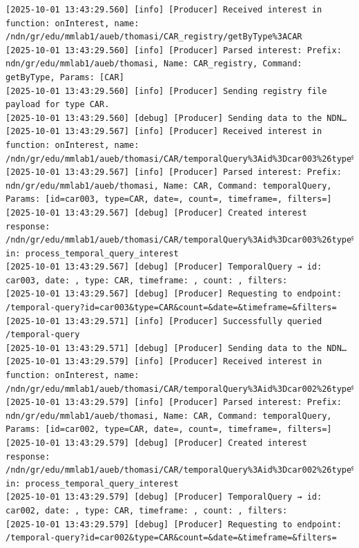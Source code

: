 \documentclass{article}
\begin{document}
\begin{lstlisting}[language=log, caption={Producer logs after receiving a \emph{GET by TYPE} request from \emph{MMLab2}}, label={lst:producer-logs-get-by-type-from-mmlab2}]
[2025-10-01 13:43:29.560] [info] [Producer] Received interest in function: onInterest, name: /ndn/gr/edu/mmlab1/aueb/thomasi/CAR_registry/getByType%3ACAR
[2025-10-01 13:43:29.560] [info] [Producer] Parsed interest: Prefix: ndn/gr/edu/mmlab1/aueb/thomasi, Name: CAR_registry, Command: getByType, Params: [CAR]
[2025-10-01 13:43:29.560] [info] [Producer] Sending registry file payload for type CAR.
[2025-10-01 13:43:29.560] [debug] [Producer] Sending data to the NDN…
[2025-10-01 13:43:29.567] [info] [Producer] Received interest in function: onInterest, name: /ndn/gr/edu/mmlab1/aueb/thomasi/CAR/temporalQuery%3Aid%3Dcar003%26type%3DCAR%26date%3D%26count%3D%26timeframe%3D%26filters%3D
[2025-10-01 13:43:29.567] [info] [Producer] Parsed interest: Prefix: ndn/gr/edu/mmlab1/aueb/thomasi, Name: CAR, Command: temporalQuery, Params: [id=car003, type=CAR, date=, count=, timeframe=, filters=]
[2025-10-01 13:43:29.567] [debug] [Producer] Created interest response: /ndn/gr/edu/mmlab1/aueb/thomasi/CAR/temporalQuery%3Aid%3Dcar003%26type%3DCAR%26date%3D%26count%3D%26timeframe%3D%26filters%3D in: process_temporal_query_interest
[2025-10-01 13:43:29.567] [debug] [Producer] TemporalQuery → id: car003, date: , type: CAR, timeframe: , count: , filters: 
[2025-10-01 13:43:29.567] [debug] [Producer] Requesting to endpoint: /temporal-query?id=car003&type=CAR&count=&date=&timeframe=&filters=
[2025-10-01 13:43:29.571] [info] [Producer] Successfully queried /temporal-query
[2025-10-01 13:43:29.571] [debug] [Producer] Sending data to the NDN…
[2025-10-01 13:43:29.579] [info] [Producer] Received interest in function: onInterest, name: /ndn/gr/edu/mmlab1/aueb/thomasi/CAR/temporalQuery%3Aid%3Dcar002%26type%3DCAR%26date%3D%26count%3D%26timeframe%3D%26filters%3D
[2025-10-01 13:43:29.579] [info] [Producer] Parsed interest: Prefix: ndn/gr/edu/mmlab1/aueb/thomasi, Name: CAR, Command: temporalQuery, Params: [id=car002, type=CAR, date=, count=, timeframe=, filters=]
[2025-10-01 13:43:29.579] [debug] [Producer] Created interest response: /ndn/gr/edu/mmlab1/aueb/thomasi/CAR/temporalQuery%3Aid%3Dcar002%26type%3DCAR%26date%3D%26count%3D%26timeframe%3D%26filters%3D in: process_temporal_query_interest
[2025-10-01 13:43:29.579] [debug] [Producer] TemporalQuery → id: car002, date: , type: CAR, timeframe: , count: , filters: 
[2025-10-01 13:43:29.579] [debug] [Producer] Requesting to endpoint: /temporal-query?id=car002&type=CAR&count=&date=&timeframe=&filters=

\end{lstlisting}
\end{document}
